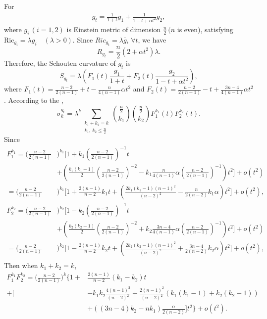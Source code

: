 \documentclass[12pt]{amsart}
\newcommand{\bg}{\bar{g}}
\numberwithin{equation}{section}
\begin{document}
For 
\begin{align*}
g_t = \frac{1}{1+t} g_1 + \frac{1}{1 - t + \alpha t^2} g_2,
\end{align*}
where $g_i\,(i=1,2)$ is Einstein metric of dimension $\frac{n}{2}\,(n$ is even), satisfying $\mathrm{Ric}_{g_i} = \lambda g_i \quad (\lambda > 0)$. Since $Ric_{g_t}=\lambda \bg$, $\forall t$, we have
\begin{equation*}
    R_{g_t}=\frac{n}{2}\left(2+\alpha t^2\right)\lambda.
\end{equation*}
Therefore, the Schouten curvature of $g_t$ is 
\begin{equation*}
    S_{g_t}=\lambda\left(F_1(t)\frac{g_1}{1+t}+F_2(t)\frac{g_2}{1-t+\alpha t^2}\right),
\end{equation*}
where $F_1(t)=\frac{n-2}{2(n-1)}+t-\frac{n}{4(n-1)}\alpha t^2$ and $F_2(t)=\frac{n-2}{2(n-1)}-t+\frac{3n-4}{4(n-1)}\alpha t^2$. According to the ,
\begin{equation*}
    \sigma_k^{g_t}=\lambda^k\sum_{\substack{k_1+k_2=k \\ k_1,\ k_2\leq\frac{n}{2}}}\binom{\frac{n}{2}}{k_1}\binom{\frac{n}{2}}{k_2}F_1^{k_1}(t)F_2^{k_2}(t).
\end{equation*}
Since
\begin{align*}
    F_1^{k_1}=\Bigg(\frac{n-2}{2(n-1)}&\Bigg)^{k_1}\Bigg[1+k_1\left(\frac{n-2}{2(n-1)}\right)^{-1}t\\
    &+\left(\frac{k_1(k_1-1)}{2}\left(\frac{n-2}{2(n-1)}\right)^{-2}-k_1\frac{n}{4(n-1)}\alpha\left(\frac{n-2}{2(n-1)}\right)^{-1}\right)t^2\Bigg]+o(t^2)\\
    =\Bigg(\frac{n-2}{2(n-1)}&\Bigg)^{k_1}\Bigg[1+\frac{2(n-1)}{n-2}k_1t+\left(\frac{2k_1(k_1-1)(n-1)^2}{(n-2)^2}-\frac{n}{2(n-2)}k_1\alpha\right)t^2\Bigg]+o(t^2),\\
    F_2^{k_2}=\Bigg(\frac{n-2}{2(n-1)}&\Bigg)^{k_2}\Bigg[1-k_2\left(\frac{n-2}{2(n-1)}\right)^{-1}t\\
    &+\left(\frac{k_2(k_2-1)}{2}\left(\frac{n-2}{2(n-1)}\right)^{-2}+k_2\frac{3n-4}{4(n-1)}\alpha\left(\frac{n-2}{2(n-1)}\right)^{-1}\right)t^2\Bigg]+o(t^2)\\
    =\Bigg(\frac{n-2}{2(n-1)}&\Bigg)^{k_2}\Bigg[1-\frac{2(n-1)}{n-2}k_2t+\left(\frac{2k_2(k_2-1)(n-1)^2}{(n-2)^2}+\frac{3n-4}{2(n-2)}k_2\alpha\right)t^2\Bigg]+o(t^2),\\
\end{align*}
Then when $k_1+k_2=k$,
\begin{align*}
    F_1^{k_1}F_2^{k_2}=\Bigg(\frac{n-2}{2(n-1)}\Bigg)^{k}\Bigg\{1+&\frac{2(n-1)}{n-2}(k_1-k_2)t\\
    +\Bigg[&-k_1k_2\frac{4(n-1)^2}{(n-2)^2}+\frac{2(n-1)^2}{(n-2)^2}\left(k_1(k_1-1)+k_2(k_2-1)\right)\\
    &+\left((3n-4)k_2-nk_1\right)\frac{\alpha}{2(n-2)}\Bigg]t^2\Bigg\}+o(t^2).
\end{align*}
\end{document}
